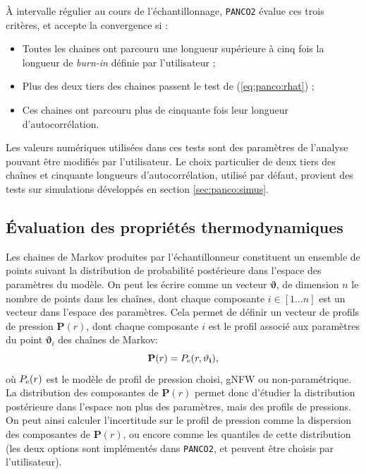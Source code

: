 À intervalle régulier au cours de l'échantillonnage, \texttt{PANCO2} évalue ces trois critères, et accepte la convergence si :
\begin{itemize}[leftmargin=*]
    \setlength\itemsep{5pt}
    \item Toutes les chaines ont parcouru une longueur supérieure à cinq fois la longueur de \textit{burn-in} définie par l'utilisateur ;
    \item Plus des deux tiers des chaines passent le test de \citeauthor{gelman_inference_1992} (\ref{eq:panco:rhat}) ;
    \item Ces chaines ont parcouru plus de cinquante fois leur longueur d'autocorrélation.
\end{itemize}
Les valeurs numériques utilisées dans ces tests sont des paramètres de l'analyse pouvant être modifiés par l'utilisateur.
Le choix particulier de deux tiers des chaînes et cinquante longueurs d'autocorrélation, utilisé par défaut, provient des tests sur simulations développés en section \ref{sec:panco:simus}.

\subsection{Évaluation des propriétés thermodynamiques} \label{sec:panco:thermo}

Les chaines de Markov produites par l'échantillonneur constituent un ensemble de points suivant la distribution de probabilité postérieure dans l'espace des paramètres du modèle.
On peut les écrire comme un vecteur $\mathbf{\vartheta}$, de dimension $n$ le nombre de points dans les chaînes, dont chaque composante $i \in [1 \dots n]$ est un vecteur dans l'espace des paramètres.
Cela permet de définir un vecteur de profils de pression $\mathbf{P}(r)$, dont chaque composante $i$ est le profil associé aux paramètres du point $\mathbf{\vartheta}_i$ des chaînes de Markov:
\begin{equation}
    \label{eq:panco:press_vec}
    \mathbf{P}(r) = P_{\rm e}(r, \mathbf{\vartheta_i}),
\end{equation}
où $P_{\rm e}(r)$ est le modèle de profil de pression choisi, gNFW ou non-paramétrique. \\
La distribution des composantes de $\mathbf{P}(r)$ permet donc d'étudier la distribution postérieure dans l'espace non plus des paramètres, mais des profils de pressions.
On peut ainsi calculer l'incertitude sur le profil de pression comme la dispersion des composantes de $\mathbf{P}(r)$, ou encore comme les quantiles de cette distribution (les deux options sont implémentés dans \texttt{PANCO2}, et peuvent être choisis par l'utilisateur).

